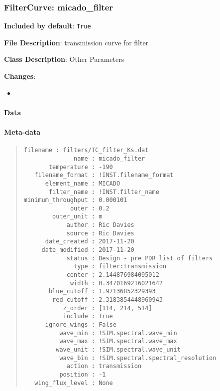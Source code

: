 \subsubsection{FilterCurve: \textquotedbl{}micado\_filter\textquotedbl{}%
  \label{filtercurve-micado-filter}%
}

\textbf{Included by default}: \texttt{True}

\textbf{File Description}: transmission curve for filter

\textbf{Class Description}: Other Parameters

\textbf{Changes}:

\begin{itemize}
\item \end{itemize}


\paragraph{Data%
  \label{data}%
}


\paragraph{Meta-data%
  \label{meta-data}%
}

\begin{quote}
\begin{alltt}
\begin{lstlisting}[frame=single]
          filename : filters/TC_filter_Ks.dat
              name : micado_filter
       temperature : -190
   filename_format : !INST.filename_format
      element_name : MICADO
       filter_name : !INST.filter_name
minimum_throughput : 0.000101
             outer : 0.2
        outer_unit : m
            author : Ric Davies
            source : Ric Davies
      date_created : 2017-11-20
     date_modified : 2017-11-20
            status : Design - pre PDR list of filters
              type : filter:transmission
            center : 2.144876984095012
             width : 0.3470169216021642
       blue_cutoff : 1.97136852329393
        red_cutoff : 2.3183854448960943
           z_order : [114, 214, 514]
           include : True
      ignore_wings : False
          wave_min : !SIM.spectral.wave_min
          wave_max : !SIM.spectral.wave_max
         wave_unit : !SIM.spectral.wave_unit
          wave_bin : !SIM.spectral.spectral_resolution
            action : transmission
          position : -1
   wing_flux_level : None
\end{lstlisting}
\end{alltt}
\end{quote}



